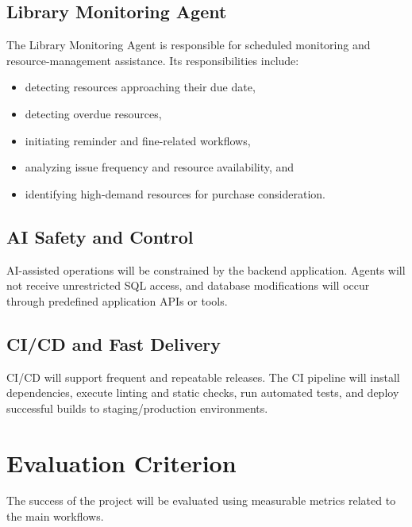 \documentclass[11pt]{article}
\begin{document}
\subsection{Library Monitoring Agent}
The Library Monitoring Agent is responsible for scheduled monitoring and resource-management assistance. Its responsibilities include:
\begin{itemize}
    \item detecting resources approaching their due date,
    \item detecting overdue resources,
    \item initiating reminder and fine-related workflows,
    \item analyzing issue frequency and resource availability, and
    \item identifying high-demand resources for purchase consideration.
\end{itemize}

\subsection{AI Safety and Control}
AI-assisted operations will be constrained by the backend application. Agents will not receive unrestricted SQL access, and database modifications will occur through predefined application APIs or tools.

\subsection{CI/CD and Fast Delivery}
CI/CD will support frequent and repeatable releases. The CI pipeline will install dependencies, execute linting and static checks, run automated tests, and deploy successful builds to staging/production environments.

\section{Evaluation Criterion}
The success of the project will be evaluated using measurable metrics related to the main workflows.
\end{document}

